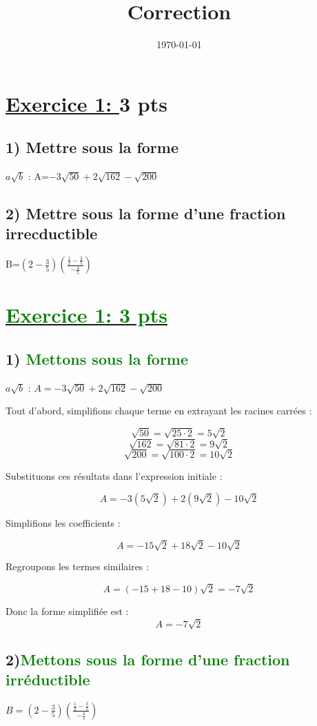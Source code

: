 \documentclass[12pt]{article}
\author{}
\title{\textbf{Correction}}
\date{\today}
\begin{document}
\maketitle
\newpage

\section*{\underline{Exercice 1: }\textbf{3 pts}}
\subsection*{1) Mettre sous la forme } $a\sqrt{b}$ : A=$-3\sqrt{50}+2\sqrt{162}-\sqrt{200}$
\subsection*{2) Mettre sous la forme d'une fraction irrecductible } B=$\left( 2-\frac{3}{5}\right) \left(  \frac{\frac{1}{2}-\frac{3}{5}}{-\frac{4}{5}}\right) $

\section*{\underline{\textcolor{green}{Exercice 1: \textbf{3 pts}}}}

\subsection*{1) \textcolor{green}{Mettons sous la forme }} $a\sqrt{b}$ : $A = -3\sqrt{50} + 2\sqrt{162} - \sqrt{200}$

Tout d'abord, simplifions chaque terme en extrayant les racines carrées :

\[
\sqrt{50} = \sqrt{25 \cdot 2} = 5\sqrt{2}
\]
\[
\sqrt{162} = \sqrt{81 \cdot 2} = 9\sqrt{2}
\]
\[
\sqrt{200} = \sqrt{100 \cdot 2} = 10\sqrt{2}
\]

Substituons ces résultats dans l'expression initiale :

\[
A = -3(5\sqrt{2}) + 2(9\sqrt{2}) - 10\sqrt{2}
\]

Simplifions les coefficients :

\[
A = -15\sqrt{2} + 18\sqrt{2} - 10\sqrt{2}
\]

Regroupons les termes similaires :

\[
A = (-15 + 18 - 10)\sqrt{2} = -7\sqrt{2}
\]

Donc la forme simplifiée est :
\[
A = -7\sqrt{2}
\]

\subsection*{2)\textcolor{green}{Mettons sous la forme d'une fraction irréductible }} $B = \left( 2 - \frac{3}{5} \right) \left( \frac{\frac{1}{2} - \frac{3}{5}}{-\frac{4}{5}} \right)$
\end{document}
